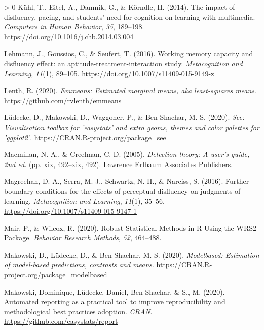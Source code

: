 \documentclass[
  english,
  jou]{apa7}
\newlength{\cslhangindent}
\newenvironment{CSLReferences}[3] %
 {%
  \setlength{\parindent}{0pt}
  \ifodd #1 \everypar{\setlength{\hangindent}{\cslhangindent}}\ignorespaces\fi
  \ifnum #2 > 0
  \setlength{\parskip}{#2\baselineskip}
  \fi
 }%
 {}
\begin{document}
\begin{CSLReferences}{1}{0}
\leavevmode\hypertarget{ref-Kuhl2014}{}%
Kühl, T., Eitel, A., Damnik, G., \& Körndle, H. (2014). {The impact of disfluency, pacing, and students' need for cognition on learning with multimedia}. \emph{Computers in Human Behavior}, \emph{35}, 189--198. \url{https://doi.org/10.1016/j.chb.2014.03.004}

\leavevmode\hypertarget{ref-Lehmann2016}{}%
Lehmann, J., Goussios, C., \& Seufert, T. (2016). {Working memory capacity and disfluency effect: an aptitude-treatment-interaction study}. \emph{Metacognition and Learning}, \emph{11}(1), 89--105. \url{https://doi.org/10.1007/s11409-015-9149-z}

\leavevmode\hypertarget{ref-R-emmeans}{}%
Lenth, R. (2020). \emph{Emmeans: Estimated marginal means, aka least-squares means}. \url{https://github.com/rvlenth/emmeans}

\leavevmode\hypertarget{ref-R-see}{}%
Lüdecke, D., Makowski, D., Waggoner, P., \& Ben-Shachar, M. S. (2020). \emph{See: Visualisation toolbox for 'easystats' and extra geoms, themes and color palettes for 'ggplot2'}. \url{https://CRAN.R-project.org/package=see}

\leavevmode\hypertarget{ref-Macmillan2005}{}%
Macmillan, N. A., \& Creelman, C. D. (2005). \emph{{Detection theory: A user's guide, 2nd ed.}} (pp. xix, 492--xix, 492). Lawrence Erlbaum Associates Publishers.

\leavevmode\hypertarget{ref-Magreehan2016}{}%
Magreehan, D. A., Serra, M. J., Schwartz, N. H., \& Narciss, S. (2016). {Further boundary conditions for the effects of perceptual disfluency on judgments of learning}. \emph{Metacognition and Learning}, \emph{11}(1), 35--56. \url{https://doi.org/10.1007/s11409-015-9147-1}

\leavevmode\hypertarget{ref-R-WRS2}{}%
Mair, P., \& Wilcox, R. (2020). {Robust Statistical Methods in R Using the WRS2 Package}. \emph{Behavior Research Methods}, \emph{52}, 464--488.

\leavevmode\hypertarget{ref-R-modelbased}{}%
Makowski, D., Lüdecke, D., \& Ben-Shachar, M. S. (2020). \emph{Modelbased: Estimation of model-based predictions, contrasts and means}. \url{https://CRAN.R-project.org/package=modelbased}

\leavevmode\hypertarget{ref-R-report}{}%
Makowski, Dominique, Lüdecke, Daniel, Ben-Shachar, \& S., M. (2020). Automated reporting as a practical tool to improve reproducibility and methodological best practices adoption. \emph{CRAN}. \url{https://github.com/easystats/report}


\end{CSLReferences}
\end{document}
